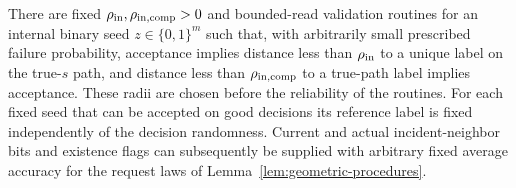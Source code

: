 \begin{lemma}\label{ig:validation}
There are fixed $\rho_{\rm in},\rho_{\rm in,comp}>0$ and bounded-read
validation routines for an internal binary seed $z\in\{0,1\}^m$ such
that, with arbitrarily small prescribed failure probability, acceptance
implies distance less than $\rho_{\rm in}$ to a unique label on the
true-$s$ path, and distance less than $\rho_{\rm in,comp}$ to a true-path
label implies acceptance. These radii are chosen before the reliability
of the routines. For each fixed seed that can be accepted on good
decisions its reference label is fixed independently of the decision
randomness. Current and actual incident-neighbor bits and existence flags
can subsequently be supplied with arbitrary fixed average accuracy for
the request laws of Lemma~\ref{lem:geometric-procedures}.
\end{lemma}

